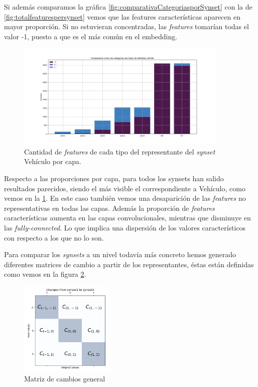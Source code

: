\documentclass[12,twoside]{TFG-GM}
\theoremstyle{definition}
\theoremstyle{remark}
\begin{document}
Si además comparamos la gráfica \ref{fig:comparativaCategoriasporSynset} con la de \ref{fig:totalfeaturespersynset} vemos que las features características aparecen en mayor proporción. Si no estuvieran concentradas, las \textit{features} tomarían todas el valor -1, puesto a que es el más común en el embedding. 
\begin{figure}[ht] 
	\centering
	\includegraphics[width=0.9\textwidth] {Images/plots/25/synsetslayer/Comparative_of_synsets_wheeled_vehicle.png}
	\caption{ Cantidad de \textit{features} de cada tipo del representante del \textit{synset} Vehículo por capa.
	\label{fig:comparativaVehiculo}}
\end{figure}

Respecto a las proporciones por capa, para todos los synsets han salido resultados parecidos, siendo el más visible el correspondiente a Vehículo, como  vemos en la \ref{fig:comparativaVehiculo}. En este caso también vemos una desaparición de las \textit{features} no representativas en todas las capas. 
Además la proporción de \textit{features} características aumenta en las capas convolucionales, mientras que disminuye en las \textit{fully-connected}. Lo que implica una dispersión de los valores característicos con respecto a los que no lo son. 

Para comparar los \textit{synsets} a un nivel todavía más concreto hemos generado diferentes matrices de cambio a partir de los representantes, éstas están definidas como vemos en la figura \ref{fig:matrizss1ss2}. 
 \begin{figure}[ht] 
	\centering
	\includegraphics[width=0.4\textwidth] {Images/plots/25/matrices/Changesfromsynset1tosynset2.png}
	\caption{ Matriz de cambios general
	\label{fig:matrizss1ss2}}
\end{figure}
\end{document}
